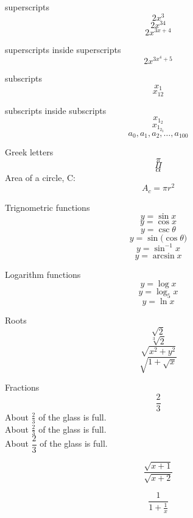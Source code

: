 \documentclass[]{article}
\begin{document}
superscripts $$2x^3$$
$$ 2x^{34} $$
$$ 2x^{3x+4} $$

superscripts inside superscripts
$$ 2x^{3x^{4}+5} $$

subscripts
$$ x_{1} $$
$$ x_{12} $$

subscripts inside subscripts
$$x_{1_{2}}$$
$$x_{1_{2_{3}}}$$
$$a_0,a_1,a_2,\ldots,a_{100}$$

Greek letters
$$\pi$$
$$\Pi$$
$$\alpha$$
Area of a circle, C: $$A_{c} = \pi r^{2}$$

Trignometric functions
$$y = \sin x$$
$$y = \cos x$$
$$y=\csc \theta$$
$$y=\sin{(\cos{\theta}})$$
$$y=\sin^{-1} x$$
$$y=\arcsin x$$

Logarithm functions
$$y=\log x$$
$$y=\log_{5} x$$
$$y=\ln {x}$$

Roots
$$\sqrt{2}$$
$$\sqrt[3]{2}$$
$$\sqrt{x^{2}+y^{2}}$$
$$\sqrt{ 1+\sqrt{x}  }$$

Fractions
$$\frac{2}{3}$$
About $\displaystyle \frac{2}{3}$ of the glass is full.\\[16pt]
About $\frac{2}{3}$ of the glass is full.\\[6pt]
About $\dfrac{2}{3}$ of the glass is full.

$$\frac{\sqrt{x+1}}{\sqrt{x+2}}$$

$$ \frac{1}{1 + \frac{1}{x}}$$
\end{document}

